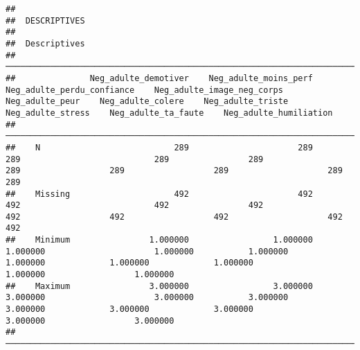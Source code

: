 \documentclass[
]{article}
\begin{document}
\begin{verbatim}
## 
##  DESCRIPTIVES
## 
##  Descriptives                                                                                                                                                                                                                                                
##  ─────────────────────────────────────────────────────────────────────────────────────────────────────────────────────────────────────────────────────────────────────────────────────────────────────────────────────────────────────────────────────────── 
##               Neg_adulte_demotiver    Neg_adulte_moins_perf    Neg_adulte_perdu_confiance    Neg_adulte_image_neg_corps    Neg_adulte_peur    Neg_adulte_colere    Neg_adulte_triste    Neg_adulte_stress    Neg_adulte_ta_faute    Neg_adulte_humiliation   
##  ─────────────────────────────────────────────────────────────────────────────────────────────────────────────────────────────────────────────────────────────────────────────────────────────────────────────────────────────────────────────────────────── 
##    N                           289                      289                           289                           289                289                  289                  289                  289                    289                       289   
##    Missing                     492                      492                           492                           492                492                  492                  492                  492                    492                       492   
##    Minimum                1.000000                 1.000000                      1.000000                      1.000000           1.000000             1.000000             1.000000             1.000000               1.000000                  1.000000   
##    Maximum                3.000000                 3.000000                      3.000000                      3.000000           3.000000             3.000000             3.000000             3.000000               3.000000                  3.000000   
##  ───────────────────────────────────────────────────────────────────────────────────────────────────────────────────────────────────────────────────────────────────────────────────────────────────────────────────────────────────────────────────────────
\end{verbatim}
\end{document}
